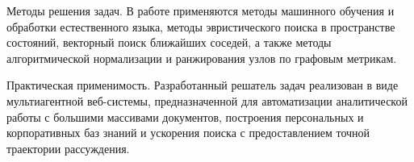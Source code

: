 Методы решения задач. В работе применяются методы машинного обучения и обработки естественного языка, методы эвристического поиска в пространстве состояний, векторный поиск ближайших соседей, а также методы алгоритмической нормализации и ранжирования узлов по графовым метрикам.

Практическая применимость. Разработанный решатель задач реализован в виде мультиагентной веб-системы, предназначенной для автоматизации аналитической работы с большими массивами документов, построения персональных и корпоративных баз знаний и ускорения поиска с предоставлением точной траектории рассуждения.
